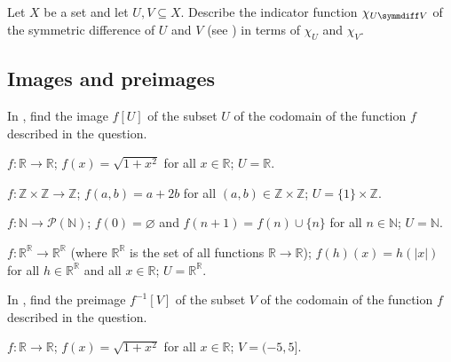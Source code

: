 \begin{chapex}
Let $X$ be a set and let $U, V \subseteq X$. Describe the indicator function $\chi_{U \symmdiff V}$ of the symmetric difference of $U$ and $V$ (see ) in terms of $\chi_U$ and $\chi_V$.
\end{chapex}

\subsection*{Images and preimages}

In , find the image $f[U]$ of the subset $U$ of the codomain of the function $f$ described in the question.

\begin{chapex}
\label{cqComputeImageBegin}
$f : \mathbb{R} \to \mathbb{R}$; $f(x) = \sqrt{1+x^2}$ for all $x \in \mathbb{R}$; $U = \mathbb{R}$.
\end{chapex}

\begin{chapex}
$f : \mathbb{Z} \times \mathbb{Z} \to \mathbb{Z}$; $f(a,b) = a+2b$ for all $(a,b) \in \mathbb{Z} \times \mathbb{Z}$; $U = \{ 1 \} \times \mathbb{Z}$.
\end{chapex}

\begin{chapex}
$f : \mathbb{N} \to \mathcal{P}(\mathbb{N})$; $f(0) = \varnothing$ and $f(n+1) = f(n) \cup \{ n \}$ for all $n \in \mathbb{N}$; $U = \mathbb{N}$.
\end{chapex}

\begin{chapex}
$f : \mathbb{R}^{\mathbb{R}} \to \mathbb{R}^{\mathbb{R}}$ (where $\mathbb{R}^{\mathbb{R}}$ is the set of all functions $\mathbb{R} \to \mathbb{R}$); $f(h)(x) = h(|x|)$ for all $h \in \mathbb{R}^{\mathbb{R}}$ and all $x \in \mathbb{R}$; $U = \mathbb{R}^{\mathbb{R}}$.
\end{chapex}

In , find the preimage $f^{-1}[V]$ of the subset $V$ of the codomain of the function $f$ described in the question.

\begin{chapex}
\label{cqComputePreimageBegin}
$f : \mathbb{R} \to \mathbb{R}$; $f(x) = \sqrt{1+x^2}$ for all $x \in \mathbb{R}$; $V = (-5,5]$.
\end{chapex}

